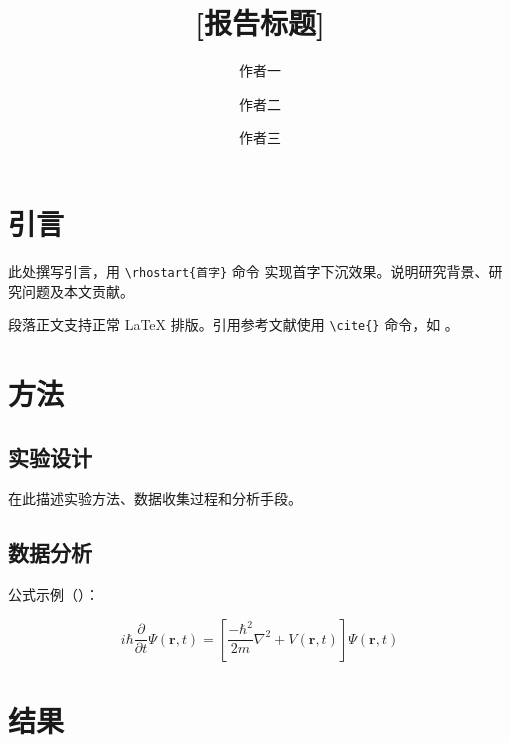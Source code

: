 \documentclass[9pt,a4paper,twocolumn,twoside]{rho-class/rho}
\title{[报告标题]}
\author[{\textasteriskcentered},a,1]{作者一}
\author[{\textdagger},b,2]{作者二}
\author[{\textdagger},c,3]{作者三}
\affil[a]{机构一}
\affil[b]{机构二}
\affil[c]{机构三}
\begin{document}
    \maketitle
    \thispagestyle{firststyle}



\section{引言}

    此处撰写引言，用 \texttt{\textbackslash rhostart\{首字\}} 命令
    实现首字下沉效果。说明研究背景、研究问题及本文贡献。

    段落正文支持正常 \LaTeX{} 排版。引用参考文献使用
    \texttt{\textbackslash cite\{\}} 命令，如 \cite{ref1}。


\section{方法}

    \subsection{实验设计}
    
        在此描述实验方法、数据收集过程和分析手段。

    \subsection{数据分析}

        公式示例（）：

        \begin{equation}\label{eq:example}
            i\hbar \frac{\partial}{\partial t}\Psi(\mathbf{r},t) =
            \left[\frac{-\hbar^2}{2m}\nabla^2 + V(\mathbf{r},t)\right]
            \Psi(\mathbf{r},t)
        \end{equation}


\section{结果}
\end{document}
